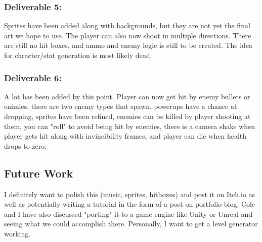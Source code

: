 \documentclass[10pt,conference,onecolumn,compsoc]{IEEEtran}
\begin{document}
\subsubsection*{Deliverable 5:} Sprites have been added along with 
backgrounds, but they 
are not yet the final art we hope to use. The player can also now
shoot in multiple directions. There are still no hit boxes, and ammo and 
enemy logic is still to be created. The idea for chracter/stat
generation is most likely dead.

\subsubsection*{Deliverable 6:}A lot has been added by this point. Player 
can now get hit by 
enemy bullets or enimies, there are two enemy types that 
spawn, powerups have a chance at dropping, sprites have been refined, 
enemies can be killed by player shooting at them, you can "roll"
to avoid being hit by enemies, there is a camera shake when player gets hit 
along with invincibility frames, and player can die when
health drops to zero.

\subsection{Future Work}
I definitely want to polish this (music, sprites, hitboxes) and post it on Itch.io as well as potentially
writing a tutorial in the form of a post on portfolio blog. Cole and I have also discussed "porting" it to 
a game engine like Unity or Unreal and seeing what we could accomplish there. Personally, I want to get 
a level generator working. 


%
%
%
%








\end{document}
